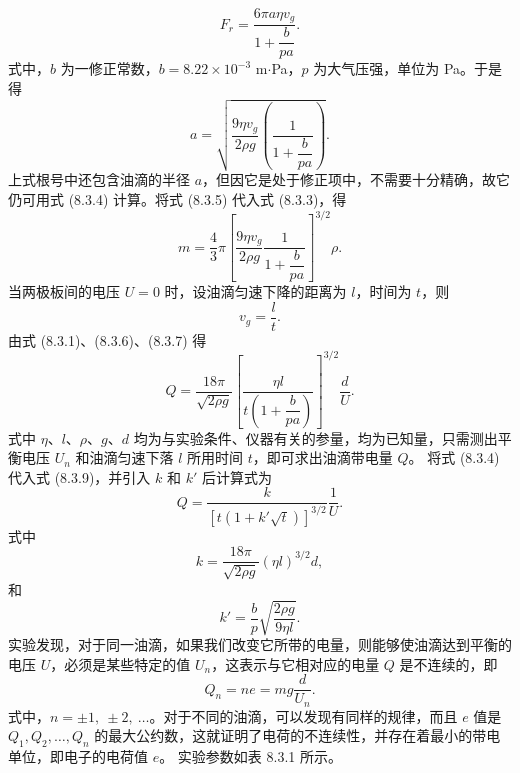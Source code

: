 \begin{equation}F_r=\frac{6\pi a\eta v_g}{1+\dfrac{b}{pa}}.\tag{8.3.5}\end{equation}
式中，$b$ 为一修正常数，$b=8.22\times10^{-3}$ m$\cdot$Pa，$p$ 为大气压强，单位为 Pa。于是得
\begin{equation}a=\sqrt{\frac{9\eta v_g}{2\rho g}\left(\frac{1}{1+\dfrac{b}{pa}}\right)}.\tag{8.3.6}\end{equation}
上式根号中还包含油滴的半径 $a$，但因它是处于修正项中，不需要十分精确，故它仍可用式 (8.3.4) 计算。将式 (8.3.5) 代入式 (8.3.3)，得
\begin{equation}m=\frac{4}{3}\pi\left[\frac{9\eta v_g}{2\rho g}\frac{1}{1+\dfrac{b}{pa}}\right]^{3/2}\rho.\tag{8.3.7}\end{equation}
当两极板间的电压 $U=0$ 时，设油滴匀速下降的距离为 $l$，时间为 $t$，则
\begin{equation}v_g=\frac{l}{t}.\tag{8.3.8}\end{equation}
由式 (8.3.1)、(8.3.6)、(8.3.7) 得
\begin{equation}Q=\frac{18\pi}{\sqrt{2\rho g}}\left[\frac{\eta l}{t\left(1+\dfrac{b}{pa}\right)}\right]^{3/2}\frac{d}{U}.\tag{8.3.9}\end{equation}
式中 $\eta$、$l$、$\rho$、$g$、$d$ 均为与实验条件、仪器有关的参量，均为已知量，只需测出平衡电压 $U_n$ 和油滴匀速下落 $l$ 所用时间 $t$，即可求出油滴带电量 $Q$。
将式 (8.3.4) 代入式 (8.3.9)，并引入 $k$ 和 $k'$ 后计算式为
\begin{equation}Q=\frac{k}{\left[t\left(1+k'\sqrt{t}\right)\right]^{3/2}}\frac{1}{U}.\tag{8.3.10}\end{equation}
式中
\begin{equation}k=\frac{18\pi}{\sqrt{2\rho g}}(\eta l)^{3/2}d,\tag{8.3.11}\end{equation}
和
\begin{equation}k'=\frac{b}{p}\sqrt{\frac{2\rho g}{9\eta l}}.\tag{8.3.12}\end{equation}
实验发现，对于同一油滴，如果我们改变它所带的电量，则能够使油滴达到平衡的电压 $U$，必须是某些特定的值 $U_n$，这表示与它相对应的电量 $Q$ 是不连续的，即
\begin{equation}Q_n=ne=mg\frac{d}{U_n}.\tag{8.3.13}\end{equation}
式中，$n=\pm1,\ \pm2,\ \ldots$。对于不同的油滴，可以发现有同样的规律，而且 $e$ 值是 $Q_1,Q_2,\ldots,Q_n$ 的最大公约数，这就证明了电荷的不连续性，并存在着最小的带电单位，即电子的电荷值 $e$。
实验参数如表 8.3.1 所示。
